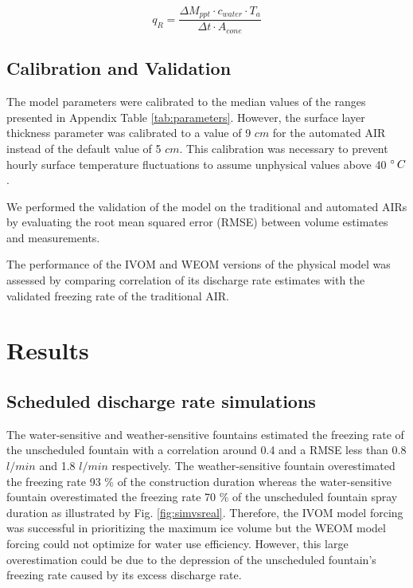 \documentclass[tc, manuscript]{copernicus}
\begin{document}
\begin{equation}
  q_{R} = \frac{\Delta M_{ppt} \cdot c_{water} \cdot T_{a}}{\Delta t \cdot A_{cone}}
\end{equation}

\subsection{Calibration and Validation}

The model parameters were calibrated to the median values of the ranges presented in Appendix Table
\ref{tab:parameters}. However, the surface layer thickness parameter was calibrated to a value of 9 $cm$ for the
automated AIR instead of the default value of 5 $cm$. This calibration was necessary to prevent hourly surface
temperature fluctuations to assume unphysical values above 40 $^{\circ}\,C$.

We performed the validation of the model on the traditional and automated AIRs by evaluating the root mean
squared error (RMSE) between volume estimates and measurements. 

The performance of the IVOM and WEOM versions of the physical model was assessed by comparing correlation of its
discharge rate estimates with the validated freezing rate of the traditional AIR.

\section{Results}

\subsection{Scheduled discharge rate simulations}

The water-sensitive and weather-sensitive fountains estimated the freezing rate of the unscheduled fountain with
a correlation around 0.4 and a RMSE less than 0.8 $l/min$ and 1.8  $l/min$ respectively. The weather-sensitive
fountain overestimated the freezing rate 93 \% of the construction duration whereas the water-sensitive fountain
overestimated the freezing rate 70 \% of the unscheduled fountain spray duration as illustrated by Fig.
\ref{fig:simvsreal}. Therefore, the IVOM model forcing was successful in prioritizing the maximum ice volume but
the WEOM model forcing could not optimize for water use efficiency. However, this large overestimation could be
due to the depression of the unscheduled fountain's freezing rate caused by its excess discharge rate. 
\end{document}
